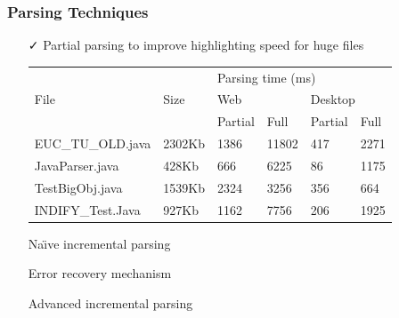\documentclass[xcolor=table,aspectratio=169]{beamer}
\begin{document}
\begin{frame}[fragile]
  \frametitle{Parsing Techniques}  
  
  \begin{itemize}
    \item[\faCheck] Partial parsing to improve highlighting speed for huge files
    \begin{table}[]
      \begin{tabular}{|l|l|llll|}
      \hline
      \multirow{3}{*}{File} & \multirow{3}{*}{Size} & \multicolumn{4}{l|}{Parsing time (ms)}                                                          \\ \cline{3-6} 
                            &                       & \multicolumn{2}{l|}{Web}                                  & \multicolumn{2}{l|}{Desktop}        \\ \cline{3-6} 
                            &                       & \multicolumn{1}{l|}{Partial} & \multicolumn{1}{l|}{Full}  & \multicolumn{1}{l|}{Partial} & Full \\ \hline \hline
      EUC\_TU\_OLD.java     & 2302Kb                & \multicolumn{1}{l|}{1386}    & \multicolumn{1}{l|}{11802} & \multicolumn{1}{l|}{417}     & 2271 \\ \hline
      \rowcolor[HTML]{FD6864}
      JavaParser.java       & 428Kb                 & \multicolumn{1}{l|}{666}     & \multicolumn{1}{l|}{6225}  & \multicolumn{1}{l|}{86}      & 1175 \\ \hline
      TestBigObj.java       & 1539Kb                & \multicolumn{1}{l|}{2324}    & \multicolumn{1}{l|}{3256}  & \multicolumn{1}{l|}{356}     & 664  \\ \hline
      INDIFY\_Test.Java     & 927Kb                 & \multicolumn{1}{l|}{1162}    & \multicolumn{1}{l|}{7756}  & \multicolumn{1}{l|}{206}     & 1925 \\ \hline
      \end{tabular}
      \end{table}
    \pause  
    \item[\faGears] Na\"{\i}ve incremental parsing 
    \item[\faGears] Error recovery mechanism
    \item[\faHourglassHalf] Advanced incremental parsing
  \end{itemize}
\end{frame}
\end{document}
